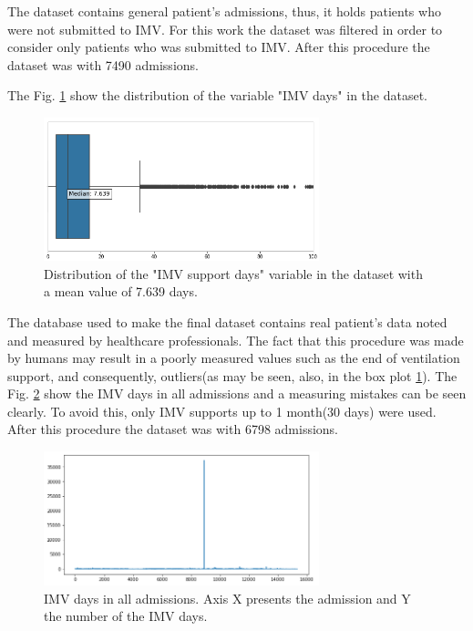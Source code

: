 \documentclass[journal]{IEEEtran} %
\begin{document}
The dataset contains general patient's admissions, thus, it holds patients who were not submitted to IMV. For this work the dataset was filtered in order to consider only patients who was submitted to IMV. After this procedure the dataset was with 7490 admissions.

The Fig. \ref{fig:imv_box} show the distribution of the variable "IMV days" in the dataset.

\begin{figure}[htp]
    \centering
    \includegraphics[width=8cm]{Project2-Report_FAA/figures/imv_box.png}
    \caption{Distribution of the "IMV support days" variable in the dataset with a mean value of 7.639 days.}
    \label{fig:imv_box}
\end{figure}

The database used to make the final dataset contains real patient's data noted and measured by healthcare professionals. The fact that this procedure was made by humans may result in a poorly measured values such as the end of ventilation support, and consequently, outliers(as may be seen, also, in the box plot \ref{fig:imv_box}). The Fig. \ref{fig:outlier} show the IMV days in all admissions and a measuring mistakes can be seen clearly. To avoid this, only IMV supports up to 1 month(30 days) were used.  After this procedure the dataset was with 6798 admissions.

\begin{figure}[htp]
    \centering
    \includegraphics[width=8cm]{Project2-Report_FAA/figures/outlier.png}
    \caption{IMV days in all admissions. Axis X presents the admission and Y the number of the IMV days.}
    \label{fig:outlier}
\end{figure}
\end{document}
